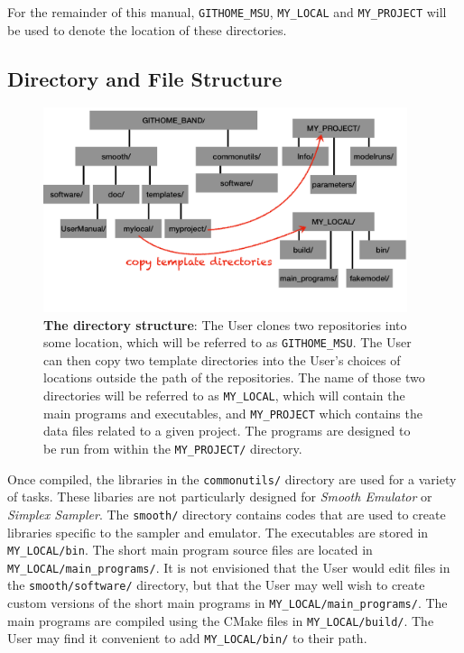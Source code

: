 \documentclass[UserManual.tex]{subfiles}
\begin{document}
For the remainder of this manual, {\tt GITHOME\_MSU}, {\tt MY\_LOCAL} and {\tt MY\_PROJECT} will be used to denote the location of these directories.

\subsection{Directory and File Structure}

\begin{figure}
\centerline{\includegraphics[width = 0.95\textwidth]{directorystructure}}
\caption{{\bf The directory structure}: The User clones two repositories into some location, which will be referred to as {\tt GITHOME\_MSU}. The User can then copy two template directories into the User's choices of locations outside the path of the repositories. The name of those two directories will be referred to as {\tt MY\_LOCAL}, which will contain the main programs and executables, and {\tt MY\_PROJECT} which contains the data files related to a given project. The programs are designed to be run from within the {\tt MY\_PROJECT/} directory.}
\end{figure}

Once compiled, the libraries in the {\tt commonutils/} directory are used for a variety of tasks. These libaries are not particularly designed for {\it Smooth Emulator} or {\it Simplex Sampler}. The {\tt smooth/} directory contains codes that are used to create libraries specific to the sampler and emulator. The executables are stored in {\tt MY\_LOCAL/bin}. The short main program source files are located in {\tt MY\_LOCAL/main\_programs/}. It is not envisioned that the User would edit files in the {\tt smooth/software/} directory, but that the User may well wish to create custom versions of the short main programs in {\tt MY\_LOCAL/main\_programs/}. The main programs are compiled using the CMake files in {\tt MY\_LOCAL/build/}. The User may find it convenient to add {\tt MY\_LOCAL/bin/} to their path.
\end{document}

